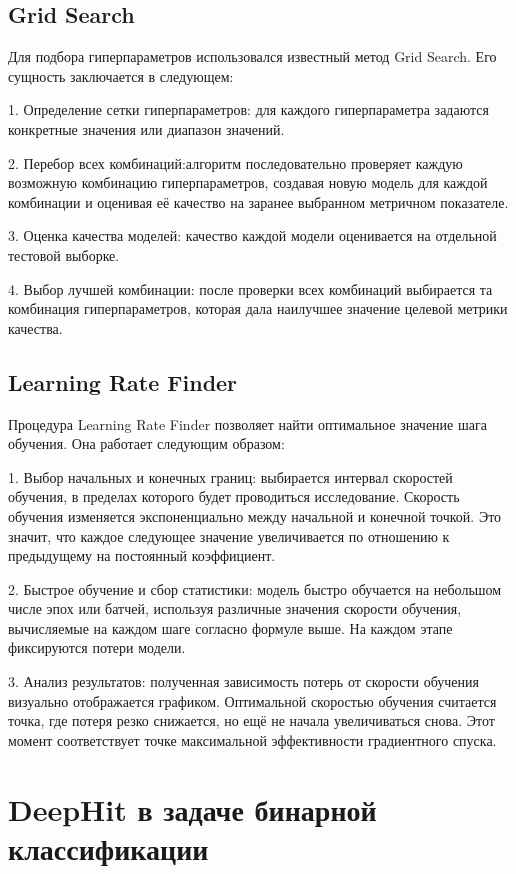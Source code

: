 \documentclass[a4paper,14pt,oneside,openany]{memoir}
\begin{document}
\subsection{Grid Search}

Для подбора гиперпараметров использовался известный метод Grid Search. Его сущность заключается в следующем: 

1. Определение сетки гиперпараметров: для каждого гиперпараметра задаются конкретные значения или диапазон значений. 

2. Перебор всех комбинаций:алгоритм последовательно проверяет каждую возможную комбинацию гиперпараметров, создавая новую модель для каждой комбинации и оценивая её качество на заранее выбранном метричном показателе.

3. Оценка качества моделей: качество каждой модели оценивается на отдельной тестовой выборке.

4. Выбор лучшей комбинации: после проверки всех комбинаций выбирается та комбинация гиперпараметров, которая дала наилучшее значение целевой метрики качества. 

\subsection{Learning Rate Finder}

Процедура Learning Rate Finder позволяет найти оптимальное значение шага обучения. Она работает следующим образом: 

1. Выбор начальных и конечных границ: выбирается интервал скоростей обучения, в пределах которого будет проводиться исследование. Скорость обучения изменяется экспоненциально между начальной и конечной точкой. Это значит, что каждое следующее значение увеличивается по отношению к предыдущему на постоянный коэффициент. 

2. Быстрое обучение и сбор статистики: модель быстро обучается на небольшом числе эпох или батчей, используя различные значения скорости обучения, вычисляемые на каждом шаге согласно формуле выше. На каждом этапе фиксируются потери модели.

3. Анализ результатов: полученная зависимость потерь от скорости обучения визуально отображается графиком. Оптимальной скоростью обучения считается точка, где потеря резко снижается, но ещё не начала увеличиваться снова. Этот момент соответствует точке максимальной эффективности градиентного спуска.



\section{DeepHit в задаче бинарной классификации}
\end{document}
